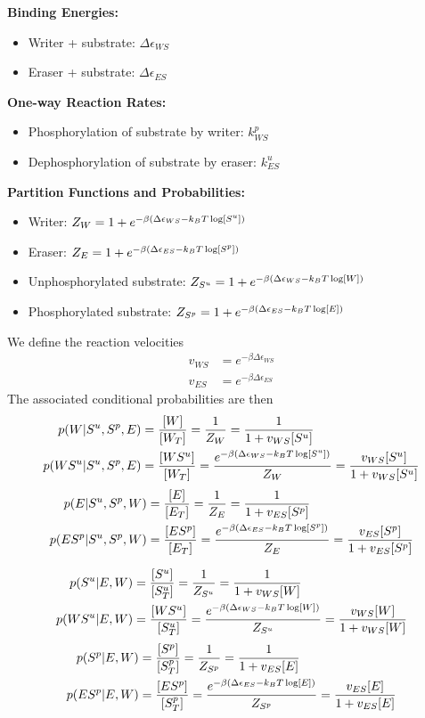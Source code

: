 \documentclass[aps,onecolumn,superscriptaddress,notitlepage]{revtex4-1}
\begin{document}
\textbf{Binding Energies:}
\begin{itemize}
\item Writer + substrate: $\Delta\epsilon_{WS}$
\item Eraser + substrate: $\Delta\epsilon_{ES}$
\end{itemize}

\textbf{One-way Reaction Rates:}
\begin{itemize}
\item Phosphorylation of substrate by writer: $k_{WS}^p$
\item Dephosphorylation of substrate by eraser: $k_{ES}^u$
\end{itemize}

\textbf{Partition Functions and Probabilities:}
\begin{itemize}
\item Writer: $Z_W = 1 + e^{-\beta\qty(\Delta\epsilon_{WS} -k_BT \log[S^u])}$
\item Eraser: $Z_E = 1 + e^{-\beta\qty(\Delta\epsilon_{ES} -k_BT \log[S^p])}$
\item Unphosphorylated substrate: $Z_{S^u} = 1 + e^{-\beta\qty(\Delta\epsilon_{WS} -k_BT \log[W])}$
\item Phosphorylated substrate: $Z_{S^p} = 1 + e^{-\beta\qty(\Delta\epsilon_{ES} -k_BT \log[E])}$
\end{itemize}
We define the reaction velocities
\begin{align}
v_{WS} &= e^{-\beta\Delta\epsilon_{WS}}\\
v_{ES} &= e^{-\beta\Delta\epsilon_{ES}}
\end{align}
The associated conditional probabilities are then
\begin{align}
p(W|S^u,S^p, E) &= \frac{[W]}{[W_T]} = \frac{1}{Z_W} =  \frac{1}{1 + v_{WS}[S^u]}\\
p(WS^u|S^u,S^p, E) &= \frac{[WS^u]}{[W_T]}  = \frac{e^{-\beta\qty(\Delta\epsilon_{WS} -k_BT \log[S^u])}}{Z_W} =  \frac{v_{WS}[S^u]}{1 + v_{WS}[S^u]}
\end{align}
\begin{align}
p(E|S^u,S^p, W) &= \frac{[E]}{[E_T]} = \frac{1}{Z_E} =  \frac{1}{1 + v_{ES}[S^p]}\\
p(ES^p|S^u,S^p, W) &= \frac{[ES^p]}{[E_T]}  = \frac{e^{-\beta\qty(\Delta\epsilon_{ES} -k_BT \log[S^p])}}{Z_E} =  \frac{v_{ES}[S^p]}{1 + v_{ES}[S^p]}
\end{align}

\begin{align}
p(S^u|E, W) &= \frac{[S^u]}{[S^u_T]} = \frac{1}{Z_{S^u}} = \frac{1}{1 + v_{WS}[W]}\\
p(WS^u|E, W) &= \frac{[WS^u]}{[S^u_T]} = \frac{ e^{-\beta\qty(\Delta\epsilon_{WS} -k_BT \log[W])}}{Z_{S^u}} = \frac{v_{WS}[W]}{1 + v_{WS}[W]}
\end{align}
\begin{align}
p(S^p|E, W) &= \frac{[S^p]}{[S^p_T]} = \frac{1}{Z_{S^p}} = \frac{1}{1 + v_{ES}[E]}\\
p(ES^p|E, W) &= \frac{[ES^p]}{[S^p_T]} = \frac{ e^{-\beta\qty(\Delta\epsilon_{ES} -k_BT \log[E])}}{Z_{S^p}} = \frac{v_{ES}[E]}{1 + v_{ES}[E]}
\end{align}
\end{document}
